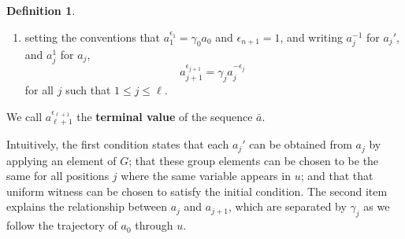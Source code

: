 \documentclass{article}
\theoremstyle{remark}
\theoremstyle{definition}
\newtheorem{definition}[theorem]{Definition}
\newcommand{\remmic}[1]{\textcolor{orange}{MP: #1}}
\newcommand{\repau}[1]{\textcolor{ForestGreen}{PM: #1}}
\begin{document}
{\begin{definition}
\begin{enumerate}
\item\label{it:badconv} setting the conventions that {$a_1^{\epsilon_1}=\gamma_0 a_0$ and } 
{$\epsilon_{n+1}=1$}, and     writing $a_j^{-1}$ for $a_j'$,  and $a_j^1$ for $a_j$, 
\[a_{j+1}^{\epsilon_{j+1}}=\gamma_j {a_j^{-\epsilon_{j}}}\;\]
for all {$j$ such that $1\leq j\leq \ell$}.
\end{enumerate}  
We call $a_{\ell+1}^{\epsilon_{\ell+1}}$ the \textbf{terminal value} of the sequence $\bar{a}$. 
\end{definition}

Intuitively, the first condition states that each $a_j'$ can be obtained from $a_j$ by applying an element of $G$; that these group  elements can be chosen to be the same for all positions $j$ where the same variable appears in $u$; and that that {uniform witness} can be chosen to satisfy the initial condition. The second item explains the relationship between $a_j$ and $a_{j+1}$, which are separated by $\gamma_j$ as we follow the trajectory of $a_0$ through $u$.


}
\end{document}
